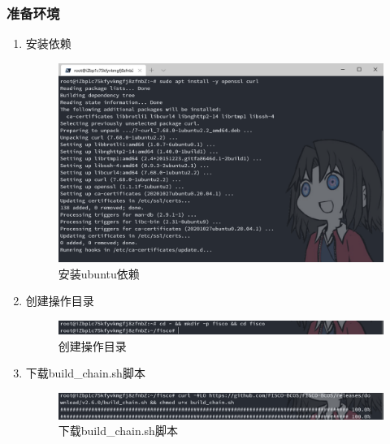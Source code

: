 \documentclass[a4paper, 11pt]{article}
\begin{document}
\subsubsection{准备环境}
\begin{enumerate}
      \item 安装依赖
      \begin{figure}[H]
            \centering
            \includegraphics[width = 0.8 \textwidth]{curl.png}
            \caption{安装ubuntu依赖}
      \end{figure}

      \item 创建操作目录
      \begin{figure}[H]
            \centering
            \includegraphics[width = 0.8 \textwidth]{fisco.png}
            \caption{创建操作目录}
      \end{figure}

      \item 下载build\_chain.sh脚本
      \begin{figure}[H]
            \centering
            \includegraphics[width = 0.8 \textwidth]{build_chain.png}
            \caption{下载build\_chain.sh脚本}
      \end{figure}
\end{enumerate}
\end{document}
